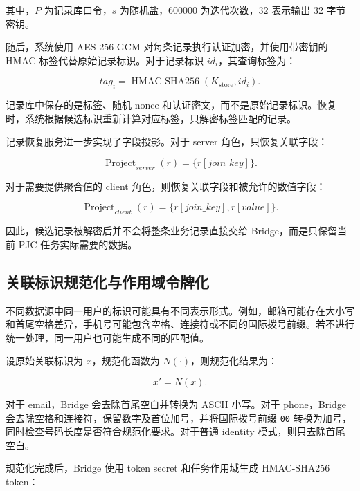 \documentclass[UTF8,a4paper,12pt,oneside]{ctexrep}
\begin{document}
其中，$P$ 为记录库口令，$s$ 为随机盐，$600000$ 为迭代次数，$32$ 表示输出 32 字节密钥。

随后，系统使用 AES-256-GCM 对每条记录执行认证加密，并使用带密钥的 HMAC 标签代替原始记录标识。对于记录标识 $id_i$，其查询标签为：

\begin{equation}
tag_i=
\operatorname{HMAC\text{-}SHA256}
(K_{\mathrm{store}},id_i).
\end{equation}

记录库中保存的是标签、随机 nonce 和认证密文，而不是原始记录标识。恢复时，系统根据候选标识重新计算对应标签，只解密标签匹配的记录。

记录恢复服务进一步实现了字段投影。对于 server 角色，只恢复关联字段：

\begin{equation}
\operatorname{Project}_{server}(r)=\{r[join\_key]\}.
\end{equation}

对于需要提供聚合值的 client 角色，则恢复关联字段和被允许的数值字段：

\begin{equation}
\operatorname{Project}_{client}(r)
=
\{r[join\_key],r[value]\}.
\end{equation}

因此，候选记录被解密后并不会将整条业务记录直接交给 Bridge，而是只保留当前 PJC 任务实际需要的数据。

\subsection{关联标识规范化与作用域令牌化}

不同数据源中同一用户的标识可能具有不同表示形式。例如，邮箱可能存在大小写和首尾空格差异，手机号可能包含空格、连接符或不同的国际拨号前缀。若不进行统一处理，同一用户也可能生成不同的匹配值。

设原始关联标识为 $x$，规范化函数为 $N(\cdot)$，则规范化结果为：

\begin{equation}
x'=N(x).
\end{equation}

对于 email，Bridge 会去除首尾空白并转换为 ASCII 小写。对于 phone，Bridge 会去除空格和连接符，保留数字及首位加号，并将国际拨号前缀 \texttt{00} 转换为加号，同时检查号码长度是否符合规范化要求。对于普通 identity 模式，则只去除首尾空白。

规范化完成后，Bridge 使用 token secret 和任务作用域生成 HMAC-SHA256 token：
\end{document}
